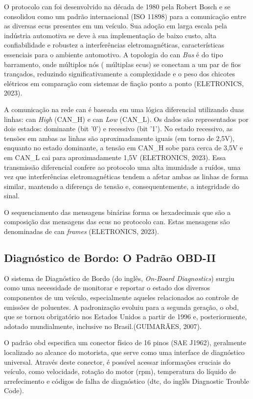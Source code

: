 \documentclass[a4paper, 12pt]{article}
\begin{document}
O protocolo \acrshort{can} foi desenvolvido na década de 1980 pela Robert Bosch e se consolidou como um padrão internacional (ISO 11898) para a comunicação entre as diversas \acrshort{ecu}s presentes em um veículo. Sua adoção em larga escala pela indústria automotiva se deve à sua implementação de baixo custo, alta confiabilidade e robustez a interferências eletromagnéticas, características essenciais para o ambiente automotivo. A topologia do \acrshort{can} \textit{Bus} é do tipo barramento, onde múltiplos nós ( múltiplas \acrshort{ecu}s) se conectam a um par de fios trançados, reduzindo significativamente a complexidade e o peso dos chicotes elétricos em comparação com sistemas de fiação ponto a ponto (ELETRONICS, 2023).

A comunicação na rede \acrshort{can} é baseada em uma lógica diferencial utilizando duas linhas: \acrshort{can} \textit{High} (CAN\_H) e \acrshort{can} \textit{Low} (CAN\_L). Os dados são representados por dois estados: dominante (bit '0') e recessivo (bit '1'). No estado recessivo, as tensões em ambas as linhas são aproximadamente iguais (em torno de 2,5V), enquanto no estado dominante, a tensão em CAN\_H sobe para cerca de 3,5V e em CAN\_L cai para aproximadamente 1,5V (ELETRONICS, 2023). Essa transmissão diferencial confere ao protocolo uma alta imunidade a ruídos, uma vez que interferências eletromagnéticas tendem a afetar ambas as linhas de forma similar, mantendo a diferença de tensão e, consequentemente, a integridade do sinal.

O sequenciamento das mensagens binárias forma os hexadecimais que são a composição das mensagens das \acrshort{ecu}s no protocolo \acrshort{can}. Estas mensagens são denominadas de \acrshort{can} \textit{frames} (ELETRONICS, 2023).
\textit{}
\subsection{Diagnóstico de Bordo: O Padrão OBD-II}

O sistema de Diagnóstico de Bordo (do inglês, \textit{On-Board Diagnostics}) surgiu como uma necessidade de monitorar e reportar o estado dos diversos componentes de um veículo, especialmente aqueles relacionados ao controle de emissões de poluentes. A padronização evoluiu para a segunda geração, o \acrshort{obd}, que se tornou obrigatório nos Estados Unidos a partir de 1996 e, posteriormente, adotado mundialmente, inclusive no Brasil.(GUIMARÃES, 2007).

O padrão \acrshort{obd} especifica um conector físico de 16 pinos (SAE J1962), geralmente localizado ao alcance do motorista, que serve como uma interface de diagnóstico universal. Através deste conector, é possível acessar informações cruciais do veículo, como velocidade, rotação do motor (\acrshort{rpm}), temperatura do líquido de arrefecimento e códigos de falha de diagnóstico (\acrshort{dtc}, do inglês Diagnostic Trouble Code).
\end{document}
